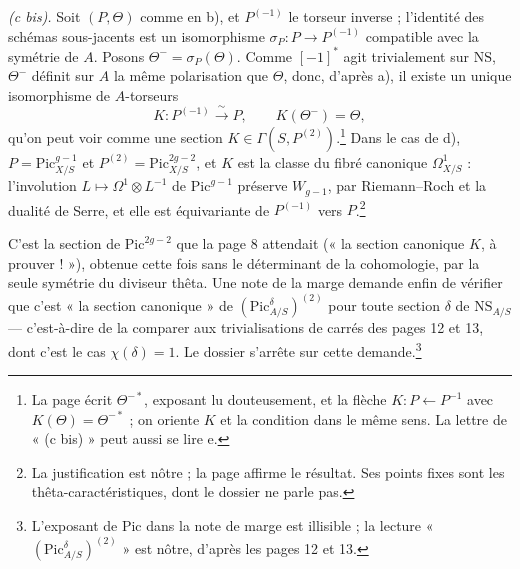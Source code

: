 \documentclass[11pt,a4paper]{article}
\begin{document}
\emph{(c bis).} Soit $(P, \Theta)$ comme en b), et $P^{(-1)}$ le torseur
inverse ; l'identité des schémas sous-jacents est un isomorphisme
$\sigma_P : P \to P^{(-1)}$ compatible avec la symétrie de $A$. Posons
$\Theta^{-} = \sigma_P(\Theta)$. Comme $[-1]^{*}$ agit trivialement sur
$\mathrm{NS}$, $\Theta^{-}$ définit sur $A$ la même polarisation que $\Theta$,
donc, d'après a), il existe un unique isomorphisme de $A$-torseurs
\[
K : P^{(-1)} \xrightarrow{\ \sim\ } P, \qquad K(\Theta^{-}) = \Theta,
\]
qu'on peut voir comme une section $K \in \Gamma(S, P^{(2)})$.\footnote{La page
écrit $\Theta^{-*}$, exposant lu douteusement, et la flèche
$K : P \leftarrow P^{-1}$ avec $K(\Theta) = \Theta^{-*}$ ; on oriente $K$ et
la condition dans le même sens. La lettre de « (c bis) » peut aussi se lire
e.} Dans le cas de d), $P = \mathrm{Pic}^{g-1}_{X/S}$ et
$P^{(2)} = \mathrm{Pic}^{2g-2}_{X/S}$, et $K$ est la classe du fibré canonique
$\Omega^{1}_{X/S}$ : l'involution $L \mapsto \Omega^{1} \otimes L^{-1}$ de
$\mathrm{Pic}^{g-1}$ préserve $W_{g-1}$, par Riemann--Roch et la dualité de
Serre, et elle est équivariante de $P^{(-1)}$ vers $P$.\footnote{La
justification est nôtre ; la page affirme le résultat. Ses points fixes sont
les thêta-caractéristiques, dont le dossier ne parle pas.}

C'est la section de $\mathrm{Pic}^{2g-2}$ que la page 8 attendait (« la
section canonique $K$, à prouver ! »), obtenue cette fois sans le déterminant
de la cohomologie, par la seule symétrie du diviseur thêta. Une note de la
marge demande enfin de vérifier que c'est « la section canonique » de
$(\mathrm{Pic}^{\delta}_{A/S})^{(2)}$ pour toute section $\delta$ de
$\mathrm{NS}_{A/S}$ — c'est-à-dire de la comparer aux trivialisations de
carrés des pages 12 et 13, dont c'est le cas $\chi(\delta) = 1$. Le dossier
s'arrête sur cette demande.\footnote{L'exposant de $\mathrm{Pic}$ dans la note
de marge est illisible ; la lecture « $(\mathrm{Pic}^{\delta}_{A/S})^{(2)}$ »
est nôtre, d'après les pages 12 et 13.}
\end{document}
